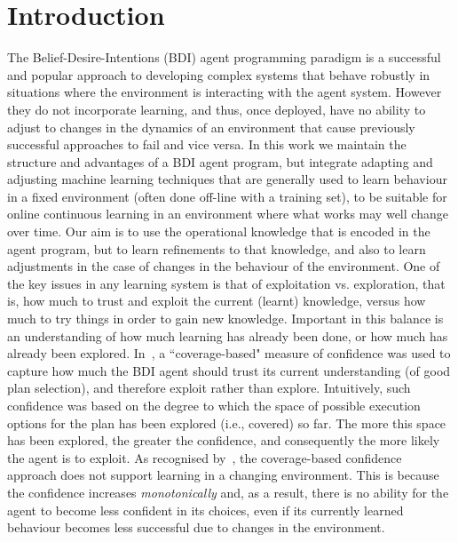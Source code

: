 \section{Introduction}\label{sec:introduction}


The Belief-Desire-Intentions (BDI) agent programming paradigm
\cite{WooldridgeBook,BusettaRHL:AL99-JACK,Pokahr:EXP03-JADEX,jasonbook} is a
successful and popular approach to developing complex systems that
behave robustly in situations where the environment is
interacting with the agent system.
However they do not incorporate learning, and thus, once deployed,
have no ability to adjust to changes in the dynamics of an environment
that cause previously successful approaches to fail and vice versa.
In this work we maintain the structure and advantages of a BDI agent
program, but integrate adapting and adjusting machine
learning techniques that are generally used to learn behaviour in a
fixed environment (often done off-line with a training set), to be
suitable for online continuous learning in an environment where what
works may well change over time.
Our aim is to use the operational knowledge that is encoded in the
agent program, but to learn refinements to that knowledge, and also to
learn adjustments in the case of changes in the behaviour of the
environment. 
One of the key issues in any learning system is that of exploitation
vs. exploration, that is, how much to trust and exploit the current
(learnt) knowledge, versus how much to try things in order to gain new
knowledge. Important in this balance is an understanding of how much
learning has already been done, or how much has already been
explored. In~\cite{singh10:extending,singh10:learning}, a
``coverage-based" measure of confidence was used to capture how much
the BDI agent should trust its current understanding (of good plan
selection), and therefore exploit rather than explore. Intuitively,
such confidence was based on the degree to which the space of possible
execution options for the plan has been explored (i.e., covered) so
far. The more this space has been explored, the
greater the confidence, and consequently the more likely the agent is
to exploit.   
%
As recognised by~\cite{singh10:learning}, the coverage-based
confidence approach does not support learning in a changing
environment. This is because the confidence increases
\emph{monotonically} and, as a result, there is no ability for the
agent to become less confident in its choices, even if its currently
learned behaviour becomes less successful due to changes in the
environment. 

